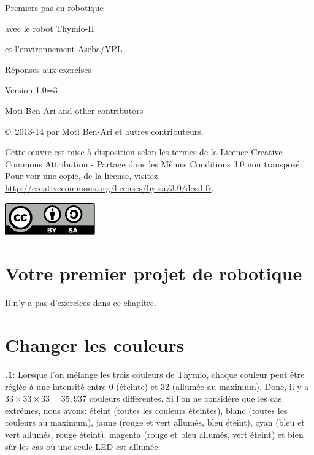 \documentclass[12pt,a4paper,english]{article}
\begin{document}
\thispagestyle{empty}

\begin{center}
\begin{bfseries}

\begin{Large}
Premiers pas en robotique

avec le robot
Thymio-II

et l'environnement
Aseba/VPL

\bigskip

Réponses aux exercises

\end{Large}

Version 1.0=3

\bigskip

\href{http://www.weizmann.ac.il/sci-tea/benari/}{Moti Ben-Ari} and other contributors

\end{bfseries}
\end{center}

\bigskip

\copyright{}\  2013-14 par \href{http://www.weizmann.ac.il/sci-tea/benari/}{Moti Ben-Ari} et autres contributeurs.

Cette œuvre est mise à disposition selon les termes de la Licence Creative Commons Attribution - Partage dans les Mêmes Conditions 3.0 non transposé.
Pour voir une copie, de la license, visitez \url{http://creativecommons.org/licenses/by-sa/3.0/deed.fr}.

\begin{center}
\hspace{6pt}\includegraphics[width=.2\textwidth]{../images/by-sa}
\end{center}


\section{Votre premier projet de robotique}

Il n'y a pas d'exercices dans ce chapitre.

\section{Changer les couleurs}

\textbf{\thesection.1}: 
Lorsque l'on mélange les trois couleurs de Thymio, chaque couleur peut être réglée à une intensité entre 0 (éteinte) et 32 (allumée au maximum). Donc, il y a $33 \times 33 \times 33=35,937$ couleurs différentes. Si l'on ne considère que les cas extrêmes, nous avons: éteint (toutes les couleurs éteintes), blanc (toutes les couleurs au maximum), jaune (rouge et vert allumés, bleu éteint), cyan (bleu et vert allumés, rouge éteint), magenta (rouge et bleu allumés, vert éteint) et bien sûr les cas où une seule LED est allumée.
\end{document}
